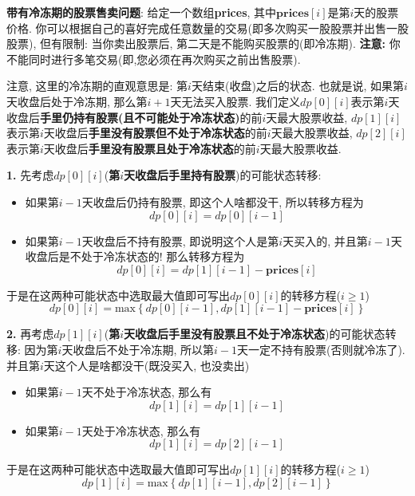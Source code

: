 \documentclass{article}
\begin{document}
\begin{homeworkProblem}
	\textbf{带有冷冻期的股票售卖问题}: 给定一个数组\textbf{prices}, 其中$\textbf{prices}[i]$是第$i$天的股票价格. 你可以根据自己的喜好完成任意数量的交易(即多次购买一股股票并出售一股股票), 但有限制: 当你卖出股票后, 第二天是不能购买股票的(即冷冻期). \textbf{注意:} 你不能同时进行多笔交易(即,您必须在再次购买之前出售股票).

	\solution 注意, 这里的冷冻期的直观意思是: 第$i$天结束(收盘)之后的状态. 也就是说, 如果第$i$天收盘后处于冷冻期, 那么第$i+1$天无法买入股票. 我们定义$dp\left[ 0 \right] \left[ i \right] $表示第$i$天收盘后\textbf{手里仍持有股票(且不可能处于冷冻状态)}的前$i$天最大股票收益, $dp\left[ 1 \right] \left[ i \right] $表示第$i$天收盘后\textbf{手里没有股票但不处于冷冻状态}的前$i$天最大股票收益, $dp\left[ 2 \right] \left[ i \right] $表示第$i$天收盘后\textbf{手里没有股票且处于冷冻状态}的前$i$天最大股票收益.

	\textbf{1.} 先考虑$dp[0][i]$(\textbf{第$i$天收盘后手里持有股票})的可能状态转移:
	\begin{itemize}
		\item 如果第$i-1$天收盘后仍持有股票, 即这个人啥都没干, 所以转移方程为$$dp\left[ 0 \right] \left[ i \right] =dp\left[ 0 \right] \left[ i-1 \right] $$
		\item 如果第$i-1$天收盘后不持有股票, 即说明这个人是第$i$天买入的, 并且第$i-1$天收盘后是不处于冷冻状态的! 那么转移方程为
		$$
		dp\left[ 0 \right] \left[ i \right] =dp\left[ 1 \right] \left[ i-1 \right] -\textbf{prices}\left[ i \right] 
		$$
	\end{itemize}
	于是在这两种可能状态中选取最大值即可写出$dp\left[ 0 \right] \left[ i \right]$的转移方程($i\geq 1$)
	$$
	dp\left[ 0 \right] \left[ i \right] =\text{max} \left\{ dp\left[ 0 \right] \left[ i-1 \right] ,dp\left[ 1 \right] \left[ i-1 \right] -\textbf{prices}\left[ i \right] \right\} 
	$$

	\textbf{2.} 再考虑$dp[1][i]$(\textbf{第$i$天收盘后手里没有股票且不处于冷冻状态})的可能状态转移: 因为第$i$天收盘后不处于冷冻期, 所以第$i-1$天一定不持有股票(否则就冷冻了). 并且第$i$天这个人是啥都没干(既没买入, 也没卖出)
	\begin{itemize}
		\item 如果第$i-1$天不处于冷冻状态, 那么有$$dp\left[ 1 \right] \left[ i \right] =dp\left[ 1 \right] \left[ i-1 \right] $$
		\item 如果第$i-1$天处于冷冻状态, 那么有$$dp\left[ 1 \right] \left[ i \right] =dp\left[ 2 \right] \left[ i-1 \right] $$
	\end{itemize}
	于是在这两种可能状态中选取最大值即可写出$dp\left[ 1 \right] \left[ i \right]$的转移方程($i\geq 1$)
	$$
	dp\left[ 1 \right] \left[ i \right] =\text{max} \left\{ dp\left[ 1 \right] \left[ i-1 \right] ,dp\left[ 2 \right] \left[ i-1 \right] \right\} 
	$$


\end{homeworkProblem}
\end{document}
